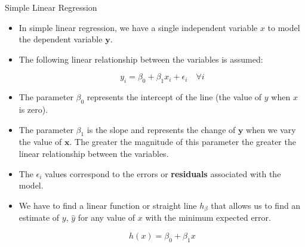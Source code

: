 \documentclass[handout]{beamer}
\begin{document}
\begin{frame}{Simple Linear Regression}
\scriptsize{
\begin{itemize}
 \item In simple linear regression, we have a single independent variable $x$ to model the dependent variable $\mathbf{y}$.

 \item The following linear relationship between the variables is assumed:

\begin{displaymath}
 y_i=\beta_{0}+\beta_{1}x_i +\epsilon_i \quad \forall i
\end{displaymath}

\item The parameter $\beta_{0}$ represents the intercept of the line (the value of $y$ when $x$ is zero).  

\item The parameter $\beta_{1}$ is the slope and represents the change of $\mathbf{y}$ when we vary the value of $\mathbf{x}$. The greater the magnitude of this parameter the greater the linear relationship between the variables.

\item The $\epsilon_{i}$ values correspond to the errors or \textbf{residuals} associated with the model.

\item We have to find a linear function or straight line $h_\beta$ that allows us to find an estimate of $y$, $\hat{y}$ for any value of $x$ with the minimum expected error.

\begin{displaymath}
h(x)=\beta_{0}+\beta_{1}x 
\end{displaymath}


\end{itemize}


} 
 
\end{frame}
\end{document}
